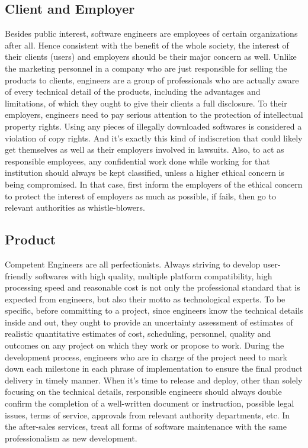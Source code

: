 \subsection{Client and Employer}

Besides public interest, software engineers are employees of certain organizations after all. Hence consistent with the benefit of the whole society, the interest of their clients (users) and employers should be their major concern as well. Unlike the marketing personnel in a company who are just responsible for selling the products to clients, engineers are a group of professionals who are actually  aware of every technical detail of the products, including the advantages and limitations, of which they ought to give their clients a full disclosure. To their employers, engineers need to pay serious attention to the protection of intellectual property rights. Using any pieces of illegally downloaded softwares is considered a violation of copy rights. And it's exactly this kind of indiscretion that could likely get themselves as well as their employers involved in lawsuits. Also, to act as responsible employees, any confidential work done while working for that institution should always be kept classified, unless a higher ethical concern is being compromised\cite{Gotterbarn:1999:PST:308769.308770}. In that case, first inform the employers of the ethical concern to protect the interest of employers as much as possible, if fails, then go to relevant authorities as whistle-blowers.



\subsection{Product}

Competent Engineers are all perfectionists.  Always striving to develop user-friendly softwares with high quality, multiple platform compatibility, high processing speed and reasonable cost is not only the professional standard that is expected from engineers, but also their motto as technological experts. To be specific, before committing to a project, since engineers know the technical details inside and out, they ought to provide an uncertainty assessment of estimates of realistic quantitative estimates of cost, scheduling, personnel, quality and outcomes on any project on which they work or propose to work\cite{Gotterbarn:1999:PST:308769.308770}.
 During the development process, engineers who are in charge of the project need to mark down each milestone in each phrase of implementation to ensure the final product delivery in timely manner. When it's time to release and deploy, other than solely focusing on the technical details, responsible engineers should always double confirm the completion of a well-written document or instruction, possible legal issues, terms of service, approvals from relevant authority departments, etc. In the after-sales services, treat all forms of software maintenance with the same professionalism as new development\cite{Gotterbarn:1999:PST:308769.308770}.
 
